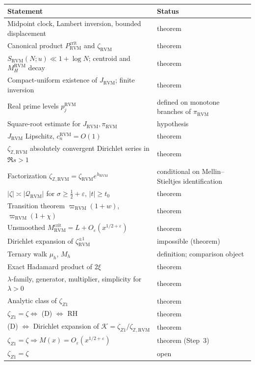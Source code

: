 \documentclass[11pt,reqno]{amsart}
\numberwithin{equation}{section}
\theoremstyle{plain}
\theoremstyle{definition}
\theoremstyle{remark}
\newcommand{\Z}{\mathbb Z}
\newcommand{\eps}{\varepsilon}
\newcommand{\RVM}{\mathrm{RVM}}
\newcommand{\crit}{\mathrm{crit}}
\begin{document}
\begin{center}
\small
\begin{tabular}{p{}p{}}
\toprule
Statement & Status\\
\midrule
Midpoint clock, Lambert inversion, bounded displacement & theorem\\
Canonical product $P_{\RVM}^{\crit}$ and $\zeta_{\RVM}$ & theorem\\
$S_{\RVM}(N;u)\ll1+\log N$; centroid and $M_H^{\RVM}$ decay & theorem\\
Compact-uniform existence of $J_{\RVM}$; finite inversion & theorem\\
Real prime levels $p_j^{\RVM}$ & defined on monotone branches of $\pi_{\RVM}$\\
Square-root estimate for $J_{\RVM},\pi_{\RVM}$ & hypothesis\\
$J_{\RVM}$ Lipschitz, $c_n^{\RVM}=O(1)$ & theorem\\
$\zeta_{\Z,\RVM}$ absolutely convergent Dirichlet series in $\Re s>1$ & theorem\\
Factorization $\zeta_{\Z,\RVM}=\zeta_{\RVM}e^{h_{\RVM}}$ & conditional on Mellin--Stieltjes identification\\
$|\zeta|\asymp|\mathcal Q_{\RVM}|$ for $\sigma\ge\frac12+\eps$, $|t|\ge t_0$ & theorem\\
Transition theorem $\varpi_{\RVM}(1+w)$, $\varpi_{\RVM}(1+\chi)$ & theorem\\
Unsmoothed $M_{\RVM}^{\crit}=L+O_\eps(x^{1/2+\eps})$ & theorem\\
Dirichlet expansion of $\zeta_{\RVM}^{\pm1}$ & impossible (theorem)\\
Ternary walk $\mu_h$, $M_h$ & definition; comparison object\\
Exact Hadamard product of $2\xi$ & theorem\\
$\lambda$-family, generator, multiplier, simplicity for $\lambda>0$ & theorem\\
Analytic class of $\zeta_{Z1}$ & theorem\\
$\zeta_{Z1}=\zeta\Leftrightarrow$ (D) $\Leftrightarrow$ RH & theorem\\
(D) $\Leftrightarrow$ Dirichlet expansion of $\mathcal K=\zeta_{Z1}/\zeta_{\Z,\RVM}$ & theorem\\
$\zeta_{Z1}=\zeta\Rightarrow M(x)=O_\eps(x^{1/2+\eps})$ & theorem (Step~3)\\
$\zeta_{Z1}=\zeta$ & open\\
\bottomrule
\end{tabular}
\end{center}
\end{document}
